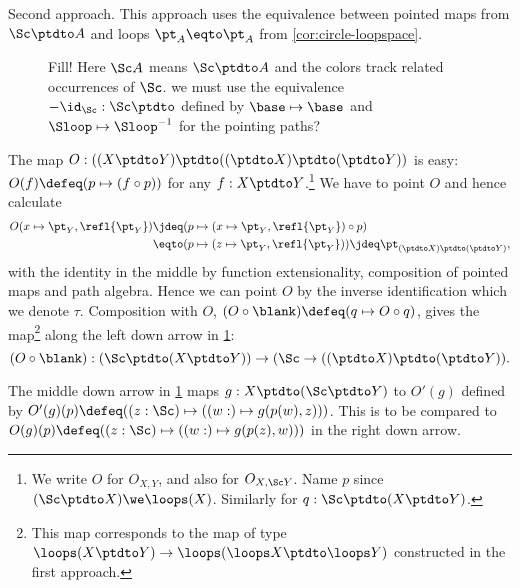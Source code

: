 \begin{remark}
Second approach. This approach uses the equivalence
between pointed maps from $\Sc\ptdto A$ and loops $\pt_A\eqto\pt_A$
from \cref{cor:circle-loopspace}.
\def\Scc{\wip{\Sc}}
\begin{figure}[h]
  \caption{\label{fig:bjørn}
  Fill! Here $\Sc A$ means $\Sc\ptdto A$ and the colors track
  related occurrences of $\Sc$. 
  we must use the equivalence $-\id_\Sc : \Sc\ptdto\Scc$ defined by
  $\base\mapsto\base$ and $\Sloop\mapsto{\Sloop}^{-1}$
  for the pointing paths?} 
\end{figure}

The map $O: ((X\ptdto Y)\ptdto((\wip{\Sc}\ptdto X)\ptdto(\wip{\Sc}\ptdto Y))$
is easy: $O(f)\defeq (p\mapsto (f\circ p))$ for any $f:X\ptdto Y$.\footnote{%
We write $O$ for $O_{X,Y}$, and also for $O_{X,\Sc Y}$.
Name $p$ since $(\Sc\ptdto X)\we\loops(X)$.
Similarly for $q:\Sc\ptdto (X \ptdto Y)$.}
We have to point $O$ and hence calculate 
\begin{align*}
O(x\mapsto\pt_Y,\refl{\pt_Y})
&\jdeq (p\mapsto(x\mapsto\pt_Y,\refl{\pt_Y})\circ p)\\
&\eqto (p\mapsto (z\mapsto\pt_Y,\refl{\pt_Y}))
 \jdeq\pt_{(\wip{\Sc}\ptdto X)\ptdto(\wip{\Sc}\ptdto Y)},
\end{align*}
with the identity in the middle by function extensionality,
composition of pointed maps and path algebra.
Hence we can point $O$ by the inverse identification which we denote $\tau$.
Composition with $O$, \ie $(O\circ\blank)\defeq(q\mapsto O\circ q)$,
gives the map\footnote{
This map corresponds to the map of type
$\loops(X\ptdto Y) \to \loops(\loops X\ptdto \loops Y)$
constructed in the first approach.} 
along the left down arrow in \cref{fig:bjørn}:
\[
(O\circ\blank): (\Sc\ptdto(X\ptdto Y))\to
(\Sc\to((\Scc\ptdto X)\ptdto(\Scc\ptdto Y)).
\]

The middle down arrow in \cref{fig:bjørn} maps
$g:X\ptdto(\Sc\ptdto Y)$ to $O'(g)$ defined by $O'(g)(p) \defeq
((z:\Sc) \mapsto ((w:\Scc) \mapsto g(p(w),z)))$.
This is to be compared to $O(g)(p) \defeq
((z:\Sc) \mapsto ((w:\Scc) \mapsto g(p(z),w)))$ in the right down arrow. 


\end{remark}

